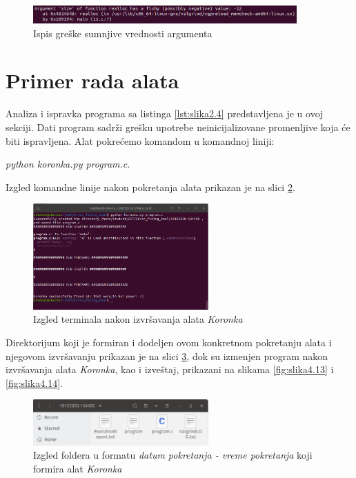 \documentclass[12pt,oneside]{memoir}
\theoremstyle{plain}
\theoremstyle{definition}
\begin{document}
\begin{figure}[!ht]
  \centering
  \includegraphics[width=0.9\textwidth]{reallocFishyArgument.png}
  \caption{Ispis greške sumnjive vrednosti argumenta}
  \label{fig:slika4.10}
\end{figure} 

\section{Primer rada alata}
Analiza i ispravka programa sa listinga \ref{lst:slika2.4} predstavljena je u ovoj sekciji. Dati program sadrži grešku upotrebe neinicijalizovane promenljive koja će biti ispravljena. Alat pokrećemo komandom u komandnoj liniji:
\begin{center}
\textit{python koronka.py program.c}.
\end{center}

Izgled komandne linije nakon pokretanja alata prikazan je na slici \ref{fig:slika4.11}. 
\begin{figure}[!ht]
  \centering
  \includegraphics[width=0.6\textwidth]{TerminalOutput.png}
  \caption{Izgled terminala nakon izvršavanja alata \textit{Koronka}}
  \label{fig:slika4.11}
\end{figure}

Direktorijum koji je formiran i dodeljen ovom konkretnom pokretanju alata i njegovom izvršavanju prikazan je na slici \ref{fig:slika4.12}, dok su izmenjen program nakon izvršavanja alata \textit{Koronka}, kao i izveštaj, prikazani na slikama \ref{fig:slika4.13} i \ref{fig:slika4.14}.
\begin{figure}[!ht]
  \centering
  \includegraphics[width=0.6\textwidth]{DateTimeFolder.png}
  \caption{Izgled foldera u formatu \textit{datum pokretanja - vreme pokretanja} koji formira alat \textit{Koronka}}
  \label{fig:slika4.12}
\end{figure}
\end{document}
